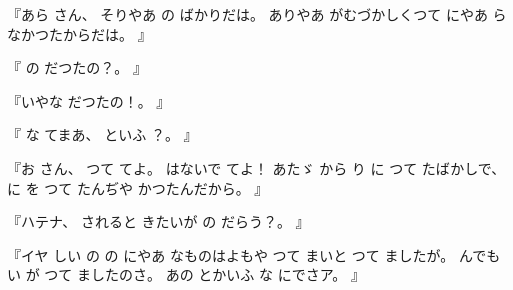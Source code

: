 『あら
さん、
%
そりやあ
の
ばかりだは。
%
ありやあ
がむづかしくつて
にやあ
らなかつたからだは。
』

『
の
だつたの？。
』

『いやな
だつたの！。
』

『
な
てまあ、
%
といふ
？。
』

『お
さん、
%
つて
てよ。
%
はないで
てよ！
あたゞ
から
り
に
つて
たばかしで、
%
に
を
つて
たんぢや
かつたんだから。
』

『ハテナ、
%
されると
きたいが
の
だらう？。
』

『イヤ
しい
の
の
にやあ
なものはよもや
つて
まいと
つて
ましたが。
%
んでも
い
が
つて
ましたのさ。
%
あの
とかいふ
な
にでさア。
』
